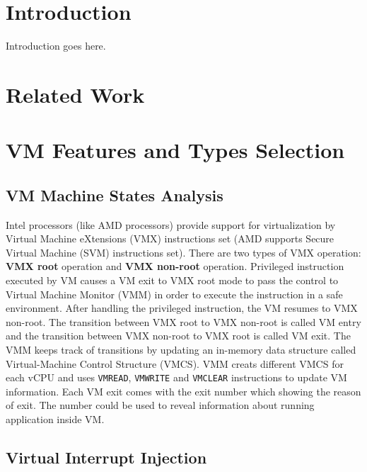 \documentclass[10pt, conference, compsocconf]{IEEEtran}
\begin{document}
\section{Introduction}

Introduction goes here. 

\section{Related Work}





\section{VM Features and Types Selection}

\subsection{VM Machine States Analysis}

Intel processors (like AMD processors) provide support for virtualization by Virtual Machine eXtensions (VMX) instructions set (AMD
supports Secure Virtual Machine (SVM) instructions set). There are two types of VMX operation: \textbf{VMX root} operation and \textbf{VMX non-root} operation.  Privileged instruction executed by VM causes a VM exit to VMX root mode to pass the control to Virtual Machine Monitor (VMM) in order to execute the instruction in a safe environment.  After handling the privileged instruction, the VM resumes to VMX non-root. The transition between VMX root to VMX non-root is called VM entry and the transition between VMX non-root to VMX root is called VM exit.  The VMM keeps track of transitions by updating an in-memory data structure called Virtual-Machine Control Structure (VMCS). VMM creats different VMCS for each vCPU and uses \texttt{VMREAD}, \texttt{VMWRITE} and \texttt{VMCLEAR} instructions to update VM information. Each VM exit comes with the exit number which showing the reason of exit. The number could be used to reveal information about running application inside VM. 

\subsection{Virtual Interrupt Injection}
\end{document}
